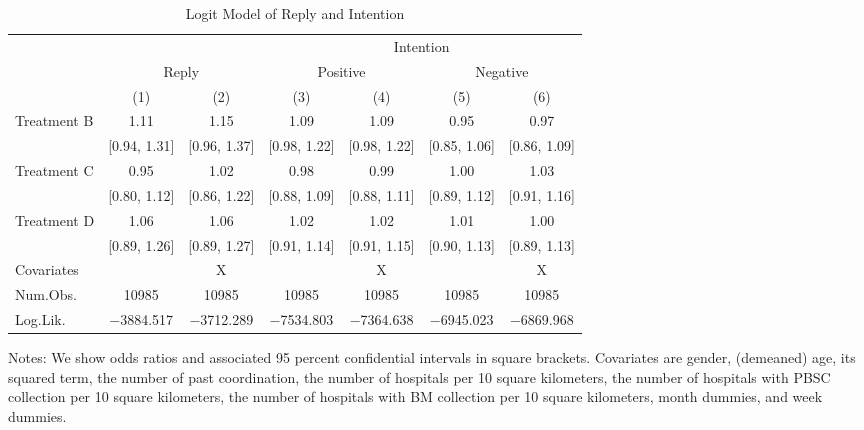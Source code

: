 \documentclass[12pt, a4paper]{article}
\begin{document}
\begin{table}[H]

\caption{\label{tab:logit-stock}Logit Model of Reply and Intention}
\centering
\fontsize{9}{11}\selectfont
\begin{threeparttable}
\begin{tabular}[t]{lcccccc}
\toprule
\multicolumn{3}{c}{ } & \multicolumn{4}{c}{Intention} \\
\cmidrule(l{3pt}r{3pt}){4-7}
\multicolumn{1}{c}{ } & \multicolumn{2}{c}{Reply} & \multicolumn{2}{c}{Positive} & \multicolumn{2}{c}{Negative} \\
\cmidrule(l{3pt}r{3pt}){2-3} \cmidrule(l{3pt}r{3pt}){4-5} \cmidrule(l{3pt}r{3pt}){6-7}
  & (1) & (2) & (3) & (4) & (5) & (6)\\
\midrule
Treatment B & \num{1.11} & \num{1.15} & \num{1.09} & \num{1.09} & \num{0.95} & \num{0.97}\\
 & {}[\num{0.94}, \num{1.31}] & {}[\num{0.96}, \num{1.37}] & {}[\num{0.98}, \num{1.22}] & {}[\num{0.98}, \num{1.22}] & {}[\num{0.85}, \num{1.06}] & {}[\num{0.86}, \num{1.09}]\\
Treatment C & \num{0.95} & \num{1.02} & \num{0.98} & \num{0.99} & \num{1.00} & \num{1.03}\\
 & {}[\num{0.80}, \num{1.12}] & {}[\num{0.86}, \num{1.22}] & {}[\num{0.88}, \num{1.09}] & {}[\num{0.88}, \num{1.11}] & {}[\num{0.89}, \num{1.12}] & {}[\num{0.91}, \num{1.16}]\\
Treatment D & \num{1.06} & \num{1.06} & \num{1.02} & \num{1.02} & \num{1.01} & \num{1.00}\\
 & {}[\num{0.89}, \num{1.26}] & {}[\num{0.89}, \num{1.27}] & {}[\num{0.91}, \num{1.14}] & {}[\num{0.91}, \num{1.15}] & {}[\num{0.90}, \num{1.13}] & {}[\num{0.89}, \num{1.13}]\\
\midrule
Covariates &  & X &  & X &  & X\\
Num.Obs. & \num{10985} & \num{10985} & \num{10985} & \num{10985} & \num{10985} & \num{10985}\\
Log.Lik. & \num{-3884.517} & \num{-3712.289} & \num{-7534.803} & \num{-7364.638} & \num{-6945.023} & \num{-6869.968}\\
\bottomrule
\end{tabular}
\begin{tablenotes}
\item Notes: We show odds ratios and associated 95 percent confidential intervals in square brackets. Covariates are gender, (demeaned) age, its squared term, the number of past coordination, the number of hospitals per 10 square kilometers, the number of hospitals with PBSC collection per 10 square kilometers, the number of hospitals with BM collection per 10 square kilometers, month dummies, and week dummies.
\end{tablenotes}
\end{threeparttable}
\end{table}
\end{document}
